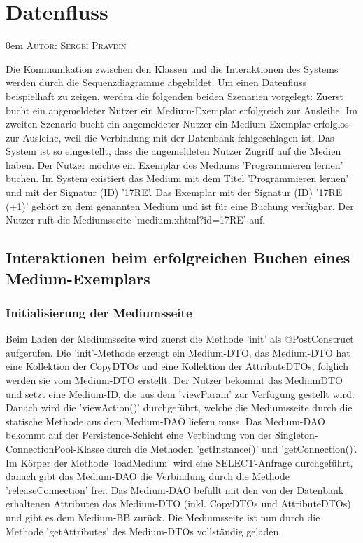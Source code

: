 \documentclass{article}
\makeatletter
\newcommand{\sectionauthor}[1]{
	{\parindent 0em \large \scshape Autor: #1 \par \nobreak \vspace*{1em}}
	\@afterheading
}
\makeatother
\begin{document}
\newpage
\section{Datenfluss}
\sectionauthor{Sergei Pravdin}
Die Kommunikation zwischen den Klassen und die Interaktionen des Systems werden durch die Sequenzdiagramme abgebildet. Um einen Datenfluss beispielhaft zu zeigen, werden die folgenden beiden Szenarien vorgelegt: Zuerst bucht ein angemeldeter Nutzer ein Medium-Exemplar erfolgreich zur Ausleihe. Im zweiten Szenario bucht ein angemeldeter Nutzer ein Medium-Exemplar erfolglos zur Ausleihe, weil die Verbindung mit der Datenbank fehlgeschlagen ist. Das System ist so eingestellt, dass die angemeldeten Nutzer Zugriff auf die Medien haben. Der Nutzer möchte ein Exemplar des Mediums 'Programmieren lernen' buchen. Im System existiert das Medium mit dem Titel 'Programmieren lernen' und mit der Signatur (ID) '17RE'. Das Exemplar mit der Signatur (ID) '17RE (+1)' gehört zu dem genannten Medium und ist für eine Buchung verfügbar. Der Nutzer ruft die Mediumsseite 'medium.xhtml?id=17RE' auf.
\subsection{Interaktionen beim erfolgreichen Buchen eines Medium-Exemplars}
\subsubsection{Initialisierung der Mediumsseite}
Beim Laden der Mediumsseite wird zuerst die Methode 'init' als @PostConstruct aufgerufen. Die 'init'-Methode erzeugt ein Medium-DTO, das Medium-DTO hat eine Kollektion der CopyDTOs und eine Kollektion der AttributeDTOs, folglich werden sie vom Medium-DTO erstellt. Der Nutzer bekommt das MediumDTO und setzt eine Medium-ID, die aus dem 'viewParam' zur Verfügung gestellt wird. Danach wird die 'viewAction()' durchgeführt, welche die Mediumsseite durch die statische Methode aus dem Medium-DAO liefern muss. Das Medium-DAO bekommt auf der Persistence-Schicht eine Verbindung von der Singleton-ConnectionPool-Klasse durch die Methoden 'getInstance()' und 'getConnection()'. Im Körper der Methode 'loadMedium' wird eine SELECT-Anfrage durchgeführt, danach gibt das Medium-DAO die Verbindung durch die Methode 'releaseConnection' frei. Das Medium-DAO befüllt mit den von der Datenbank erhaltenen Attributen das Medium-DTO (inkl. CopyDTOs und AttributeDTOs) und gibt es dem Medium-BB zurück. Die Mediumsseite ist nun durch die Methode 'getAttributes' des Medium-DTOs vollständig geladen.
\end{document}
